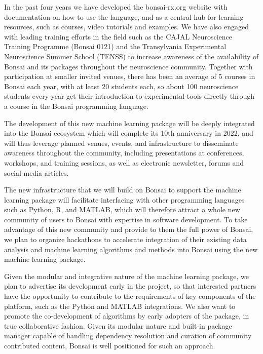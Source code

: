 In the past four years we have developed the bonsai-rx.org website with
documentation on how to use the language, and as a central hub for learning
resources, such as courses, video tutorials and examples. We have also engaged
with leading training efforts in the field such as the CAJAL Neuroscience
Training Programme (Bonsai 0121) and the Transylvania Experimental Neuroscience
Summer School (TENSS)  to increase awareness of the availability of Bonsai and
its packages throughout the neuroscience community. Together with participation
at smaller invited venues, there has been an average of 5 courses in Bonsai
each year, with at least 20 students each, so about 100 neuroscience students
every year get their introduction to experimental tools directly through a
course in the Bonsai programming language.

The development of this new machine learning package will be deeply integrated
into the Bonsai ecosystem which will complete its 10th anniversary in 2022, and
will thus leverage planned venues, events, and infrastructure to disseminate
awareness throughout the community, including presentations at conferences,
workshops, and training sessions, as well as electronic newsletter, forums and
social media articles.

The new infrastructure that we will build on Bonsai to support the machine
learning package will facilitate interfacing with other programming languages
such as Python, R, and MATLAB, which will therefore attract a whole new
community of users to Bonsai with expertise in software development. To take
advantage of this new community and provide to them the full power of Bonsai,
we plan to organize hackathons to accelerate integration of their existing data
analysis and machine learning algorithms and methods into Bonsai using the new
machine learning package.

 Given the modular and integrative nature of the machine learning package, we
 plan to advertise its development early in the project, so that interested
 partners have the opportunity to contribute to the requirements of key
 components of the platform, such as the Python and MATLAB integrations. We
 also want to promote the co-development of algorithms by early adopters of the
 package, in true collaborative fashion. Given its modular nature and built-in
 package manager capable of handling dependency resolution and curation of
 community contributed content, Bonsai is well positioned for such an approach.

